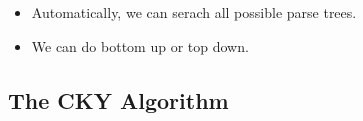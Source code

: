 \documentclass[11pt]{article}
\begin{document}
\begin{minipage}[l]{.5\linewidth}
    \begin{figure}[H]
        \centering
    \end{figure}    
\end{minipage}\hfill
\begin{minipage}[r]{.48\linewidth}
    \begin{itemize}
        \item Automatically, we can serach all possible parse trees.
        \item We can do bottom up or top down.
    \end{itemize}
\end{minipage}

\subsection{The CKY Algorithm}
\end{document}
